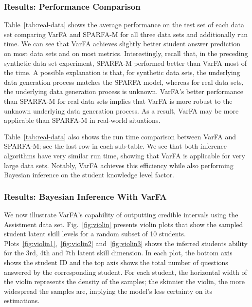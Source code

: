 \documentclass{edm_article}
\newcommand{\ml}[1]{\textcolor{orange}{\bf [LAN bandit: #1]}}
\newcommand{\jack}[1]{\textcolor{purple}{\bf [jack the ripper: #1]}}
\begin{document}
\subsubsection{Results: Performance Comparison}
Table~\ref{tab:real-data} shows the average performance on the test set of each data set comparing VarFA and SPARFA-M for all three data sets and additionally run time. We can see that VarFA achieves slightly better student answer prediction on most data sets and on most metrics. 
Interestingly, recall that, in the preceding synthetic data set experiment, SPARFA-M performed better than VarFA most of the time. 
A possible explanation is that, for synthetic data sets, the underlying data generation process matches the SPARFA model, whereas for real data sets, the underlying data generation process is unknown.
VarFA's better performance than SPARFA-M for real data sets implies that VarFA is more robust to the unknown underlying data generation process. As a result, VarFA may be more applicable than SPARFA-M in real-world situations.

Table~\ref{tab:real-data} also shows the run time comparison between VarFA and SPARFA-M; see the last row in each sub-table. We see that both inference algorithms have very similar run time, showing that VarFA is applicable for very large data sets. Notably, VarFA achieves this efficiency while also performing Bayesian inference on the student knowledge level factor. 

\subsubsection{Results: Bayesian Inference With VarFA}
We now illustrate VarFA's capability of outputting credible intervals using the Assistment data set.
Fig.~\ref{fig:violin} presents violin plots that show the sampled student latent skill levels for a random subset of 10 students. Plots~\ref{fig:violin1},~\ref{fig:violin2} and~\ref{fig:violin3} shows the inferred students ability for the 3rd, 4th and 7th latent skill dimension. In each plot, the bottom axis shows the student ID and the top axis shows the total number of questions answered by the corresponding student. For each student, the horizontal width of the violin represents the density of the samples; the skinnier the violin, the more widespread the samples are, implying the model's less certainty on its estimations.
\end{document}
